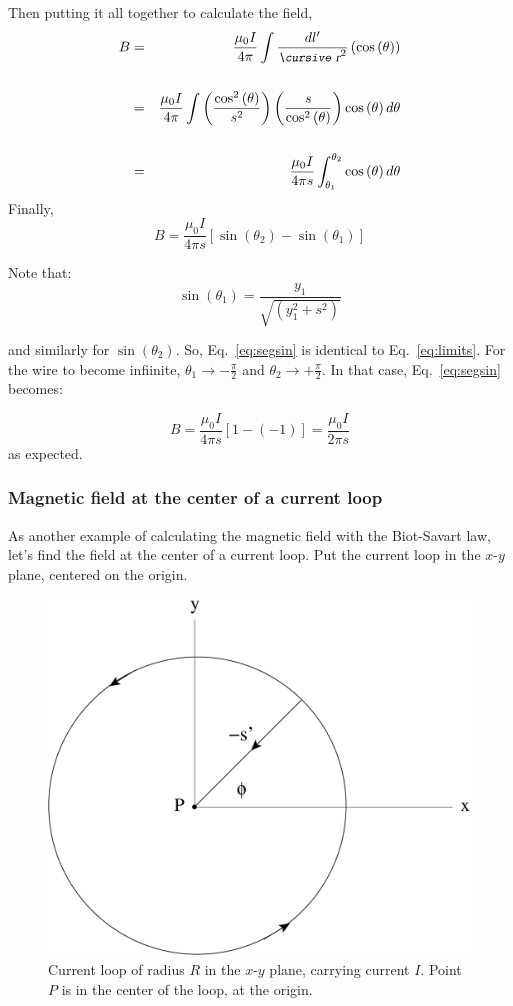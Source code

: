 \documentclass[12pt]{article}
\begin{document}
\begin{flushleft}
Then putting it all together to calculate the field,
\begin{eqnarray*}
B & =& \frac{ \mu_{0} I}{4\pi} \int \frac{ dl^{\prime}  }{\text{\small\slshape\cursive r}^{2}} \left( \cos{(\theta)} \right) \\
\vspace{.03in}\\
 & =& \frac{ \mu_{0} I}{4\pi} \int \left( \frac{\cos^{2}{(\theta)}}{s^{2}} \right) \left( \frac{s}{\cos^{2}{(\theta)}} \right) \cos{(\theta)} \, d\theta\\
\vspace{.03in}\\
 & =& \frac{ \mu_{0} I}{4\pi s} \int_{\theta_{1}}^{\theta_{2}} \cos{(\theta)} \, d\theta \\
\end{eqnarray*}
Finally,
\begin{equation}
B=\frac{ \mu_{0} I}{4\pi s} \left[ \sin{(\theta_{2})}-\sin{(\theta_{1})} \right]
\label{eq:segsin}
\end{equation}

Note that:
\[
\sin{(\theta_{1})} = \frac{y_{1}}{\sqrt{(y_{1}^{2}+s^{2})}} 
\]

and similarly for $\sin{(\theta_{2})}$.  So, Eq.~\ref{eq:segsin} is identical to Eq.~\ref{eq:limits}.  For the wire to become infiinite, $\theta_{1}\rightarrow -\frac{\pi}{2}$ and $\theta_{2} \rightarrow +\frac{\pi}{2}$.  In that case, Eq.~\ref{eq:segsin} becomes:

\[
B=\frac{ \mu_{0} I}{4\pi s} \left[ 1-(-1) \right] = \frac{ \mu_{0} I}{2\pi s}
\]
as expected.

\vspace{.2in}
{\color{mygreen} \hrulefill}
\vspace{-.2in}
\subsubsection*{\bf Magnetic field at the center of a current loop}

As another example of calculating the magnetic field with the Biot-Savart law, let's find the field at the center of a current loop.  Put the current loop in the $x$-$y$ plane, centered on the origin.
\begin{figure}[h]
\centering 
\includegraphics*[width=.35\columnwidth]{circ_in_plane.pdf} 
\caption{Current loop of radius $R$ in the $x$-$y$ plane, carrying current $I$.  Point $P$ is in the center of the loop, at the origin.}
\label{fig:inplane}
\end{figure}


\end{flushleft}
\end{document}
